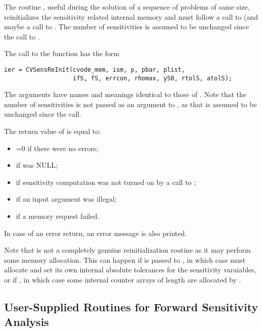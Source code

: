 The routine , useful during the solution of a sequence of problems of 
same size, reinitializes the sensitivity related internal memory 
and must follow a call to  (and maybe a call to . 
The number  of sensitivities is assumed to be unchanged since the call to 
.

The call to the  function has the form
\begin{verbatim}
ier = CVSensReInit(cvode_mem, ism, p, pbar, plist,
                   ifS, fS, errcon, rhomax, yS0, rtolS, atolS);
\end{verbatim}
The arguments have names and meanings identical to those of .
Note that the number of sensitivities  is not passed as an argument to 
, as that is assumed to be unchanged since the  call. 

The return value  of  is equal to: 
\begin{itemize}
\item {}=0 if there were no errors; 
\item {} if  was NULL;
\item {} if sensitivity computation was not turned on
      by a call to ;
\item {} if an input argument was illegal;
\item {} if a memory request failed.
\end{itemize}
In case of an error return, an error message is also printed.  

Note that  is not a completely genuine reinitialization
routine as it may perform some memory allocation. This can happen
if  is passed to , in which case {\cvodes}
must allocate and set its own internal absolute tolerances for the sensitivity
varaiables, or if , in which case some internal counter
arrays of length  are allocated by .


\subsection{User-Supplied Routines for Forward Sensitivity Analysis}\label{ss:user_fct_fwd}

